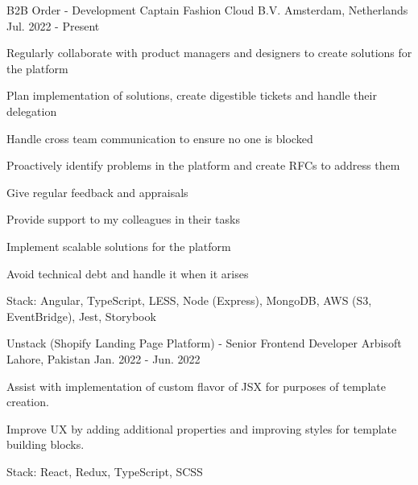 

\begin{cventries}

  \cventry
    {B2B Order - Development Captain} %
    {Fashion Cloud B.V.} %
    {Amsterdam, Netherlands} %
    {Jul. 2022 - Present} %
    {
      \begin{cvitems} %
        \item {Regularly collaborate with product managers and designers to create solutions for the platform}
        \item {Plan implementation of solutions, create digestible tickets and handle their delegation}
        \item {Handle cross team communication to ensure no one is blocked}
        \item {Proactively identify problems in the platform and create RFCs to address them}
        \item {Give regular feedback and appraisals}
        \item {Provide support to my colleagues in their tasks}
        \item {Implement scalable solutions for the platform}
        \item {Avoid technical debt and handle it when it arises}
        \item {Stack: Angular, TypeScript, LESS, Node (Express), MongoDB, AWS (S3, EventBridge), Jest, Storybook}
      \end{cvitems}
    }

  \cventry
    {Unstack (Shopify Landing Page Platform) - Senior Frontend Developer} %
    {Arbisoft} %
    {Lahore, Pakistan} %
    {Jan. 2022 - Jun. 2022} %
    {
      \begin{cvitems} %
        \item {Assist with implementation of custom flavor of JSX for purposes of template creation.}
        \item {Improve UX by adding additional properties and improving styles for template building blocks.}
        \item {Stack: React, Redux, TypeScript, SCSS}
      \end{cvitems}
    }


\end{cventries}
